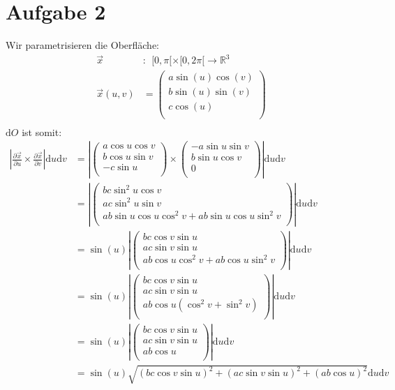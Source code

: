 \documentclass[10pt,a4paper,parskip=half]{scrartcl}
\newcommand{\vecthree}[3]{\begin{pmatrix}#1\\#2\\#3\\\end {pmatrix}}
\begin{document}
\section*{Aufgabe 2}
Wir parametrisieren die Oberfläche:
\begin{align*}
\vec x&:~~ [0,\pi[ \times [0,2\pi[ \to \mathbb{R}^3\\
\vec x(u,v) &= \vecthree{a\sin(u) \cos(v)}{b\sin(u)\sin(v)}{c \cos(u)} \\
\end{align*}
$\mathrm d  O$ ist somit:
\begin{align*}
\left|\frac{\partial \vec x}{\partial u} \times \frac{\partial \vec x}{\partial v}\right| \mathrm d u \mathrm d v &= \left|\vecthree{a \cos u \cos v}{b \cos u \sin v}{-c \sin u} \times \vecthree{-a \sin u \sin v}{b \sin u \cos v}{0}\right| \mathrm d u \mathrm d v\\
&= \left|\vecthree{bc \sin^2 u \cos v}{ac \sin^2 u \sin v}{ab \sin u \cos u \cos^2 v + ab \sin u \cos u \sin^2 v}\right| \mathrm d u \mathrm d v\\
&= \sin(u) \left| \vecthree{bc \cos v \sin u}{ac \sin v \sin u}{ab \cos u \cos^2 v + ab \cos u \sin^2 v}\right| \mathrm d u \mathrm d v\\
&= \sin(u) \left| \vecthree{bc \cos v \sin u}{ac \sin v \sin u}{ab \cos u (\cos^2 v + \sin^2 v)}\right| \mathrm d u \mathrm d v\\
&= \sin(u) \left| \vecthree{bc \cos v \sin u}{ac \sin v \sin u}{ab \cos u}\right| \mathrm d u \mathrm d v\\
&= \sin(u) \sqrt{\left(bc \cos v \sin u\right)^2 + \left(ac \sin v \sin u\right)^2 + \left(ab \cos u\right)^2} \mathrm d u \mathrm d v
\end{align*}
\end{document}
